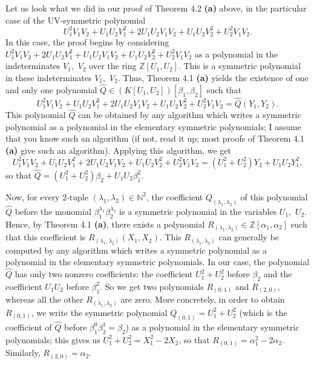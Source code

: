 \documentclass[numbers=enddot,12pt,final,onecolumn,notitlepage]{scrartcl}%
\begin{document}
Let us look what we did in our proof of Theorem 4.2 \textbf{(a)} above, in the
particular case of the UV-symmetric polynomial
\[
U_{1}^{2}V_{1}V_{2}+U_{1}U_{2}V_{1}^{2}+2U_{1}U_{2}V_{1}V_{2}+U_{1}U_{2}%
V_{2}^{2}+U_{2}^{2}V_{1}V_{2}.
\]
In this case, the proof begins by considering $U_{1}^{2}V_{1}V_{2}+2U_{1}%
U_{2}V_{1}^{2}+U_{1}U_{2}V_{1}V_{2}+U_{1}U_{2}V_{2}^{2}+U_{2}^{2}V_{1}V_{2}$
as a polynomial in the indeterminates $V_{1},$ $V_{2}$ over the ring
$\mathbb{Z}\left[  U_{1},U_{2}\right]  $. This is a symmetric polynomial in
these indeterminates $V_{1},$ $V_{2}$. Thus, Theorem 4.1 \textbf{(a)} yields
the existence of one and only one polynomial $\widehat{Q}\in\left(  K\left[
U_{1},U_{2}\right]  \right)  \left[  \beta_{1},\beta_{2}\right]  $ such that%
\[
U_{1}^{2}V_{1}V_{2}+U_{1}U_{2}V_{1}^{2}+2U_{1}U_{2}V_{1}V_{2}+U_{1}U_{2}%
V_{2}^{2}+U_{2}^{2}V_{1}V_{2}=\widehat{Q}\left(  Y_{1},Y_{2}\right)  .
\]
This polynomial $\widehat{Q}$ can be obtained by any algorithm which writes a
symmetric polynomial as a polynomial in the elementary symmetric polynomials;
I assume that you know such an algorithm (if not, read it up; most proofs of
Theorem 4.1 \textbf{(a)} give such an algorithm). Applying this algorithm, we
get
\[
U_{1}^{2}V_{1}V_{2}+U_{1}U_{2}V_{1}^{2}+2U_{1}U_{2}V_{1}V_{2}+U_{1}U_{2}%
V_{2}^{2}+U_{2}^{2}V_{1}V_{2}=\left(  U_{1}^{2}+U_{2}^{2}\right)  Y_{2}%
+U_{1}U_{2}Y_{1}^{2},
\]
so that $\widehat{Q}=\left(  U_{1}^{2}+U_{2}^{2}\right)  \beta_{2}+U_{1}%
U_{2}\beta_{1}^{2}$.

Now, for every $2$-tuple $\left(  \lambda_{1},\lambda_{2}\right)
\in\mathbb{N}^{2}$, the coefficient $Q_{\left(  \lambda_{1},\lambda
_{2}\right)  }$ of this polynomial $\widehat{Q}$ before the monomial
$\beta_{1}^{\lambda_{1}}\beta_{2}^{\lambda_{2}}$ is a symmetric polynomial in
the variables $U_{1},$ $U_{2}$. Hence, by Theorem 4.1 \textbf{(a)}, there
exists a polynomial $R_{\left(  \lambda_{1},\lambda_{2}\right)  }\in
\mathbb{Z}\left[  \alpha_{1},\alpha_{2}\right]  $ such that this coefficient
is $R_{\left(  \lambda_{1},\lambda_{2}\right)  }\left(  X_{1},X_{2}\right)  $.
This $R_{\left(  \lambda_{1},\lambda_{2}\right)  }$ can generally be computed
by any algorithm which writes a symmetric polynomial as a polynomial in the
elementary symmetric polynomials. In our case, the polynomial $\widehat{Q}$
has only two nonzero coefficients: the coefficient $U_{1}^{2}+U_{2}^{2}$
before $\beta_{2}$ and the coefficient $U_{1}U_{2}$ before $\beta_{1}^{2}$. So
we get two polynomials $R_{\left(  0,1\right)  }$ and $R_{\left(  2,0\right)
}$, whereas all the other $R_{\left(  \lambda_{1},\lambda_{2}\right)  }$ are
zero. More concretely, in order to obtain $R_{\left(  0,1\right)  }$, we write
the symmetric polynomial $Q_{\left(  0,1\right)  }=U_{1}^{2}+U_{2}^{2}$ (which
is the coefficient of $\widehat{Q}$ before $\beta_{1}^{0}\beta_{2}^{1}%
=\beta_{2}$) as a polynomial in the elementary symmetric polynomials; this
gives us $U_{1}^{2}+U_{2}^{2}=X_{1}^{2}-2X_{2}$, so that $R_{\left(
0,1\right)  }=\alpha_{1}^{2}-2\alpha_{2}$. Similarly, $R_{\left(  2,0\right)
}=\alpha_{2}$.
\end{document}
